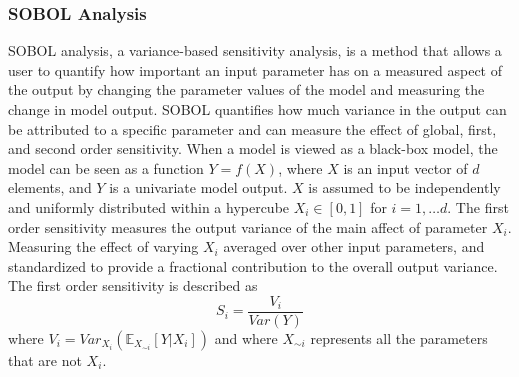 \subsubsection{SOBOL Analysis}
\label{sec:SOBOL_analysis}
SOBOL analysis, a variance-based sensitivity analysis, is a method that allows a user to quantify how important an input parameter has on a measured aspect of the output by changing the parameter values of the model and measuring the change in model output.
SOBOL quantifies how much variance in the output can be attributed to a specific parameter and can measure the effect of global, first, and second order sensitivity. 
When a model is viewed as a black-box model, the model can be seen as a function $Y=f(X)$, where $X$ is an input vector of $d$ elements, and $Y$ is a univariate model output.
$X$ is assumed to be independently and uniformly distributed within a hypercube $X_i \in [0, 1]$ for $i=1, \dots d$.
The first order sensitivity measures the output variance of the main affect of parameter $X_i$.
Measuring the effect of varying $X_i$ averaged over other input parameters, and standardized to provide a fractional contribution to the overall output variance.
The first order sensitivity is described as
\[
    S_i = \frac{V_i}{\textit{Var}(Y)}
\] where $V_i = \textit{Var}_{X_i}(\mathbb{E}_{X_{\sim i}}[Y|X_i])$ and where $X_{\sim i}$ represents all the parameters that are not $X_i$.
\newline


